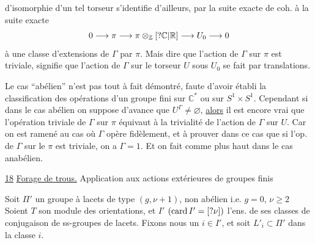 
d'isomorphie d'un tel torseur s'identifie d'ailleurs, par la suite exacte de coh.  à la suite exacte
\[
0 \longrightarrow \pi \longrightarrow
\pi\otimes_{\mathbb Z}[?\mathbb C|\mathbb R]
\longrightarrow U_0 \longrightarrow 0
\]
à une classe d'extensions de \(\Gamma\) par \(\pi\).
Mais dire que l'action de \(\Gamma\) sur \(\pi\) est triviale, signifie que l'action de \(\Gamma\) sur le torseur \(U\) sous \(U_0\) se fait par translations.

\uline{} Le cas ``abélien'' n'est pas tout à fait démontré, faute d'avoir établi la  classification  des opérations d'un groupe fini sur \(\mathbb C^{*}\) ou sur \(S^1\times S^1\). Cependant si dans le cas abélien on suppose d'avance que \(U^\Gamma\ne\varnothing\), \uline{alors}  il est encore vrai que l'opération triviale de \(\Gamma\) sur \(\pi\) équivaut à la trivialité de l'action de \(\Gamma\) sur \(U\). Car on est ramené au cas où \(\Gamma\) opère fidèlement, et à prouver dans ce cas que si l'op. de \(\Gamma\) sur le \(\pi\) est triviale, on a \(\Gamma=1\). Et on fait comme plus haut dans le cas anabélien.


\uline{18} \uline{Forage de trous.} Application aux actions extérieures de groupes finis

Soit \(\Pi'\) un groupe à lacets de type \((g,\nu+1)\), non abélien i.e.   \(g=0\),  \(\nu\ge2\)
Soient \(T\) son module des orientations, et \(I'\) \((\operatorname{card}I'=[?\nu])\) l'ens. de ses classes de conjugaison de ss-groupes de lacets. Fixons nous un \(i\in I'\), et soit \(L'_i\subset\Pi'\) dans la classe \(i\).

